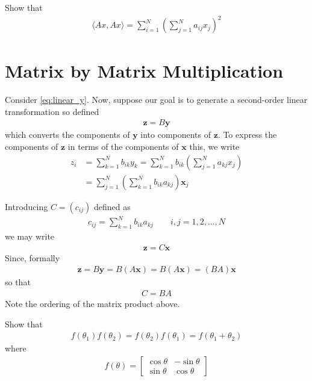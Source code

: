 \begin{homework}
	Show that 
	\begin{align}
		\langle Ax, Ax \rangle = \sum_{i=1}^{N} \left(\sum_{j=1}^{N} a_{ij}x_j\right)^2
	\end{align}
\end{homework}

\section{Matrix by Matrix Multiplication}

Consider \eqref{eq:linear_y}. Now, suppose our goal is to generate a second-order linear transformation so defined 
%
\begin{align}
	\bm{z} = B\bm{y}
\end{align}
%
which converts the components of $\bm{y}$ into components of $\bm{z}$. To express the components of $\bm{z}$ in terms of the components of $\bm{x}$ this, we write
%
\begin{align}
	z_i &= \sum_{k=1}^{N} b_{ik} y_k = \sum_{k=1}^{N} b_{ik} \left(\sum_{j=1}^{N}a_{kj}x_j\right) \\
	&= \sum_{j=1}^{N} \left(\sum_{k=1}^{N}b_{ik}a_{kj}\right)\bm{x}_j
\end{align}

Introducing $C=\left(c_{ij}\right)$ defined as 
%
\begin{align}
	c_{ij} = \sum_{k=1}^{N} b_{ik} a_{kj} \qquad i,j = 1,2,\ldots,N
\end{align}
%
we may write 
%
\begin{align}
	\bm{z} = C \bm{x}
\end{align}
%
Since, formally
%
\begin{align}
	\bm{z} = B\bm{y} = B(A\bm{x}) = B(A\bm{x}) = (BA) \bm{x}
\end{align}
%
so that 
%
\begin{align}
	C = BA
\end{align}
%
Note the ordering of the matrix product above.
%
\begin{homework}
	Show that 
	\begin{align}
		f(\theta_1) f(\theta_2) = f(\theta_2) f(\theta_1) = f(\theta_1 + \theta_2)
	\end{align}
	where 
	\begin{align}
		f(\theta) = \begin{bmatrix}
		\cos \theta & -\sin \theta \\
		\sin  \theta & \cos \theta
		\end{bmatrix}
	\end{align}
\end{homework}

